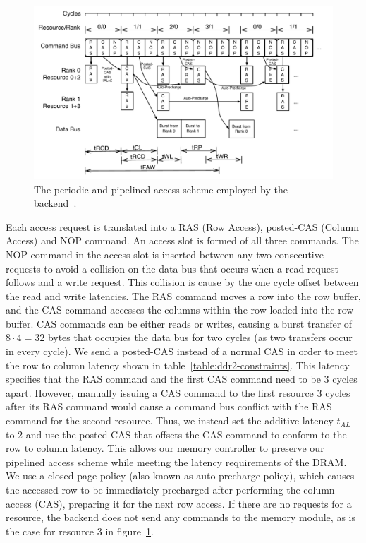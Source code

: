 \begin{figure}[h]
\begin{center}
\includegraphics[width=0.92\linewidth]{figs/backend}
\end{center} 
\caption{The periodic and pipelined access scheme employed by the backend~\cite{ReinekeLiuPatelKimLee11_PRETDRAMControllerBankPrivatizationForPredictability}.}
\label{fig:backend}
\end{figure}

Each access request is translated into a RAS (Row Access), posted-CAS (Column Access) and NOP command. 
An access slot is formed of all three commands.  
The NOP command in the access slot is inserted between any two consecutive requests to avoid a collision on the data bus that occurs when a read request follows and a write request.
This collision is cause by the one cycle offset between the read and write latencies. 
The RAS command moves a row into the row buffer, and the CAS command accesses the columns within the row loaded into the row buffer. 
CAS commands can be either reads or writes, causing a burst transfer of $8 \cdot 4 = 32$ bytes that occupies the data bus for two cycles (as two transfers occur in every cycle).
We send a posted-CAS instead of a normal CAS in order to meet the row to column latency shown in table~\ref{table:ddr2-constraints}.
This latency specifies that the RAS command and the first CAS command need to be 3 cycles apart.  
However, manually issuing a CAS command to the first resource 3 cycles after its RAS command would cause a command bus conflict with the RAS command for the second resource.
Thus, we instead set the additive latency $t_{AL}$ to 2 and use the posted-CAS that offsets the CAS command to conform to the row to column latency.
This allows our memory controller to preserve our pipelined access scheme while meeting the latency requirements of the DRAM.   
We use a closed-page policy (also known as auto-precharge policy), which causes the accessed row to be immediately precharged after performing the column access (CAS), preparing it for the next row access.
If there are no requests for a resource, the backend does not send any commands to the memory module, as is the case for resource 3 in figure~\ref{fig:backend}.

